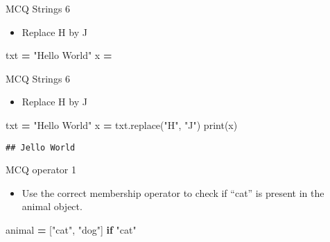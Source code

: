 \documentclass[
  8pt,
  ignorenonframetext,
]{beamer}
\newenvironment{Shaded}{\begin{snugshade}}{\end{snugshade}}
\newcommand{\BuiltInTok}[1]{#1}
\newcommand{\ControlFlowTok}[1]{\textcolor[rgb]{0.13,0.29,0.53}{\textbf{#1}}}
\newcommand{\NormalTok}[1]{#1}
\newcommand{\OperatorTok}[1]{\textcolor[rgb]{0.81,0.36,0.00}{\textbf{#1}}}
\newcommand{\StringTok}[1]{\textcolor[rgb]{0.31,0.60,0.02}{#1}}
\providecommand{\tightlist}{%
  \setlength{\itemsep}{0pt}\setlength{\parskip}{0pt}}
\begin{document}
\begin{frame}[fragile]{MCQ Strings 6}
\protect\hypertarget{mcq-strings-6}{}
\begin{itemize}
\tightlist
\item
  Replace H by J
\end{itemize}

\begin{Shaded}
\begin{Highlighting}[]
\NormalTok{txt }\OperatorTok{=} \StringTok{"Hello World"}
\NormalTok{x }\OperatorTok{=} 
\end{Highlighting}
\end{Shaded}
\end{frame}

\begin{frame}[fragile]{MCQ Strings 6}
\protect\hypertarget{mcq-strings-6-1}{}
\begin{itemize}
\tightlist
\item
  Replace H by J
\end{itemize}

\begin{Shaded}
\begin{Highlighting}[]
\NormalTok{txt }\OperatorTok{=} \StringTok{"Hello World"}
\NormalTok{x }\OperatorTok{=}\NormalTok{ txt.replace(}\StringTok{"H"}\NormalTok{, }\StringTok{"J"}\NormalTok{)}
\BuiltInTok{print}\NormalTok{(x)}
\end{Highlighting}
\end{Shaded}

\begin{verbatim}
## Jello World
\end{verbatim}
\end{frame}

\begin{frame}[fragile]{MCQ operator 1}
\protect\hypertarget{mcq-operator-1}{}
\begin{itemize}
\tightlist
\item
  Use the correct membership operator to check if ``cat'' is present in
  the animal object.
\end{itemize}

\begin{Shaded}
\begin{Highlighting}[]
\NormalTok{animal }\OperatorTok{=}\NormalTok{ [}\StringTok{"cat"}\NormalTok{, }\StringTok{"dog"}\NormalTok{]}
\ControlFlowTok{if} \StringTok{"cat"} 
\end{Highlighting}
\end{Shaded}
\end{frame}
\end{document}
